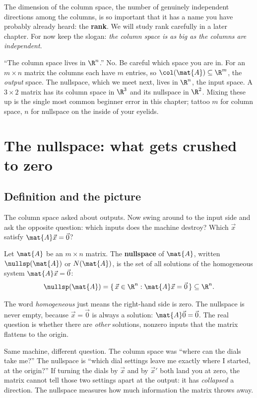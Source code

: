 The dimension of the column space, the number of genuinely independent
directions among the columns, is so important that it has a name you have
probably already heard: the \textbf{rank}. We will study rank carefully in a
later chapter. For now keep the slogan: \emph{the column space is as big as the
columns are independent}.

\begin{trapbox}
``The column space lives in $\R^n$.'' No. Be careful which space you are in. For
an $m\times n$ matrix the columns each have $m$ entries, so $\col(\mat{A})
\subseteq \R^m$, the \emph{output} space. The nullspace, which we meet next,
lives in $\R^n$, the input space. A $3\times2$ matrix has its column space in
$\R^3$ and its nullspace in $\R^2$. Mixing these up is the single most common
beginner error in this chapter; tattoo $m$ for column space, $n$ for nullspace on
the inside of your eyelids.
\end{trapbox}

\section{The nullspace: what gets crushed to zero}

\subsection{Definition and the picture}

The column space asked about outputs. Now swing around to the input side and ask
the opposite question: which inputs does the machine destroy? Which $\vec{x}$
satisfy $\mat{A}\vec{x}=\vec{0}$?

\begin{definition}[Nullspace]\label{ch12:nullspace-def}
Let $\mat{A}$ be an $m\times n$ matrix. The \textbf{nullspace} of $\mat{A}$,
written $\nullsp(\mat{A})$ or $N(\mat{A})$, is the set of all solutions of the
homogeneous system $\mat{A}\vec{x}=\vec{0}$:
\[
  \nullsp(\mat{A}) = \{\,\vec{x}\in\R^n : \mat{A}\vec{x}=\vec{0}\,\} \subseteq \R^n.
\]
\end{definition}

The word \emph{homogeneous} just means the right-hand side is zero. The
nullspace is never empty, because $\vec{x}=\vec{0}$ is always a solution:
$\mat{A}\vec{0}=\vec{0}$. The real question is whether there are \emph{other}
solutions, nonzero inputs that the matrix flattens to the origin.

\begin{intuitionbox}
Same machine, different question. The column space was ``where can the dials take
me?'' The nullspace is ``which dial settings leave me exactly where I started, at
the origin?'' If turning the dials by $\vec{x}$ and by $\vec{x}'$ both land you at
zero, the matrix cannot tell those two settings apart at the output: it has
\emph{collapsed} a direction. The nullspace measures how much information the
matrix throws away.
\end{intuitionbox}

